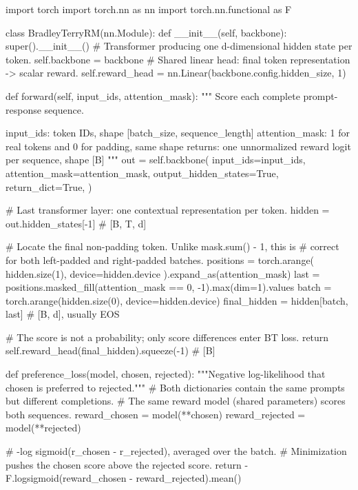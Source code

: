 \begin{codeblock}[language=Python,caption={Minimal Bradley--Terry reward model.}]
import torch
import torch.nn as nn
import torch.nn.functional as F

class BradleyTerryRM(nn.Module):
    def __init__(self, backbone):
        super().__init__()
        # Transformer producing one d-dimensional hidden state per token.
        self.backbone = backbone
        # Shared linear head: final token representation -> scalar reward.
        self.reward_head = nn.Linear(backbone.config.hidden_size, 1)

    def forward(self, input_ids, attention_mask):
        """
        Score each complete prompt-response sequence.

        input_ids:      token IDs, shape [batch_size, sequence_length]
        attention_mask: 1 for real tokens and 0 for padding, same shape
        returns:        one unnormalized reward logit per sequence, shape [B]
        """
        out = self.backbone(
            input_ids=input_ids,
            attention_mask=attention_mask,
            output_hidden_states=True,
            return_dict=True,
        )

        # Last transformer layer: one contextual representation per token.
        hidden = out.hidden_states[-1]              # [B, T, d]

        # Locate the final non-padding token. Unlike mask.sum() - 1, this is
        # correct for both left-padded and right-padded batches.
        positions = torch.arange(
            hidden.size(1), device=hidden.device
        ).expand_as(attention_mask)
        last = positions.masked_fill(attention_mask == 0, -1).max(dim=1).values
        batch = torch.arange(hidden.size(0), device=hidden.device)
        final_hidden = hidden[batch, last]           # [B, d], usually EOS

        # The score is not a probability; only score differences enter BT loss.
        return self.reward_head(final_hidden).squeeze(-1)  # [B]

def preference_loss(model, chosen, rejected):
    """Negative log-likelihood that chosen is preferred to rejected."""
    # Both dictionaries contain the same prompts but different completions.
    # The same reward model (shared parameters) scores both sequences.
    reward_chosen = model(**chosen)
    reward_rejected = model(**rejected)

    # -log sigmoid(r_chosen - r_rejected), averaged over the batch.
    # Minimization pushes the chosen score above the rejected score.
    return -F.logsigmoid(reward_chosen - reward_rejected).mean()
\end{codeblock}

